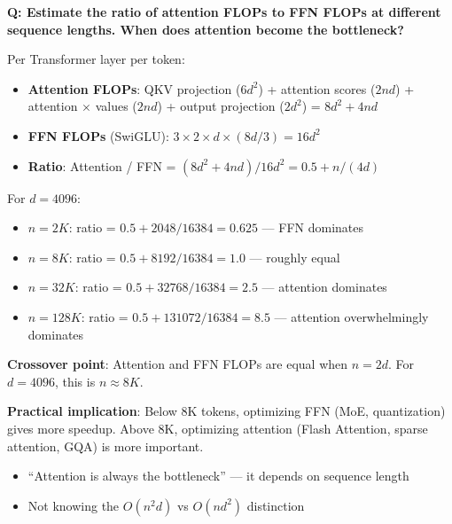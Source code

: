 \begin{interviewq}
\textbf{Q: Estimate the ratio of attention FLOPs to FFN FLOPs at different sequence lengths. When does attention become the bottleneck?}

 \quad {} \quad \badgefreq{\freqlow}

\stronganswer

Per Transformer layer per token:
\begin{itemize}
    \item \textbf{Attention FLOPs}: QKV projection ($6d^2$) + attention scores ($2nd$) + attention $\times$ values ($2nd$) + output projection ($2d^2$) = $8d^2 + 4nd$
    \item \textbf{FFN FLOPs} (SwiGLU): $3 \times 2 \times d \times (8d/3) = 16d^2$
    \item \textbf{Ratio}: Attention / FFN = $(8d^2 + 4nd) / 16d^2 = 0.5 + n/(4d)$
\end{itemize}

For $d = 4096$:
\begin{itemize}
    \item $n = 2K$: ratio = $0.5 + 2048/16384 = 0.625$ --- FFN dominates
    \item $n = 8K$: ratio = $0.5 + 8192/16384 = 1.0$ --- roughly equal
    \item $n = 32K$: ratio = $0.5 + 32768/16384 = 2.5$ --- attention dominates
    \item $n = 128K$: ratio = $0.5 + 131072/16384 = 8.5$ --- attention overwhelmingly dominates
\end{itemize}

\textbf{Crossover point}: Attention and FFN FLOPs are equal when $n = 2d$. For $d=4096$, this is $n \approx 8K$.

\textbf{Practical implication}: Below 8K tokens, optimizing FFN (MoE, quantization) gives more speedup. Above 8K, optimizing attention (Flash Attention, sparse attention, GQA) is more important.

\redflags
\begin{itemize}
    \item ``Attention is always the bottleneck'' --- it depends on sequence length
    \item Not knowing the $O(n^2 d)$ vs $O(nd^2)$ distinction
\end{itemize}



\end{interviewq}

